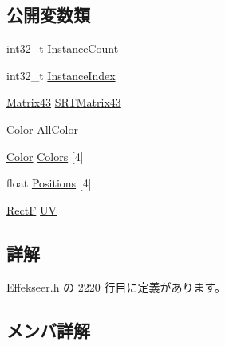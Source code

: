 \subsection*{公開変数類}
\begin{DoxyCompactItemize}
\item 
int32\+\_\+t \mbox{\hyperlink{struct_effekseer_1_1_ribbon_renderer_1_1_instance_parameter_a2af6b88f0a8ed75b33fed94f38934353}{Instance\+Count}}
\item 
int32\+\_\+t \mbox{\hyperlink{struct_effekseer_1_1_ribbon_renderer_1_1_instance_parameter_a39fb064c24fef06eee1c4deaad15e027}{Instance\+Index}}
\item 
\mbox{\hyperlink{struct_effekseer_1_1_matrix43}{Matrix43}} \mbox{\hyperlink{struct_effekseer_1_1_ribbon_renderer_1_1_instance_parameter_afc0524469889f23dec49ef302aa44c2b}{S\+R\+T\+Matrix43}}
\item 
\mbox{\hyperlink{struct_effekseer_1_1_color}{Color}} \mbox{\hyperlink{struct_effekseer_1_1_ribbon_renderer_1_1_instance_parameter_a87e802bfc8b166a32fef0b4971807a41}{All\+Color}}
\item 
\mbox{\hyperlink{struct_effekseer_1_1_color}{Color}} \mbox{\hyperlink{struct_effekseer_1_1_ribbon_renderer_1_1_instance_parameter_a4af0c70d517d18d09821b4dc04debbe5}{Colors}} \mbox{[}4\mbox{]}
\item 
float \mbox{\hyperlink{struct_effekseer_1_1_ribbon_renderer_1_1_instance_parameter_a1afec647ad8491d42678acc2e826c93a}{Positions}} \mbox{[}4\mbox{]}
\item 
\mbox{\hyperlink{struct_effekseer_1_1_rect_f}{RectF}} \mbox{\hyperlink{struct_effekseer_1_1_ribbon_renderer_1_1_instance_parameter_ae15daebe5ddca6f33083976153344531}{UV}}
\end{DoxyCompactItemize}


\subsection{詳解}


 Effekseer.\+h の 2220 行目に定義があります。



\subsection{メンバ詳解}
\mbox{\label{struct_effekseer_1_1_ribbon_renderer_1_1_instance_parameter_a87e802bfc8b166a32fef0b4971807a41}} 
